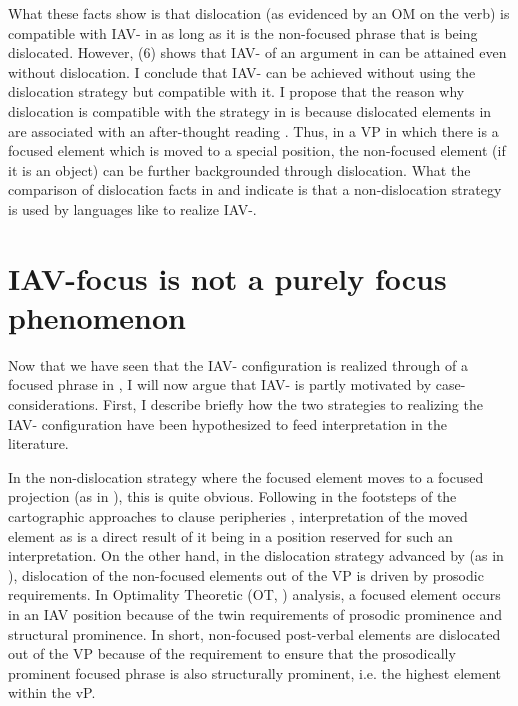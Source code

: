 \documentclass[output=paper,newtxmath,modfonts,nonflat,draft]{langsci/langscibook}
\begin{document}
What these facts show is that dislocation (as evidenced by an OM on the verb) is compatible with IAV- in  as long as it is the non-focused phrase that is being dislocated. However, (6) shows that IAV- of an argument in  can be attained even without dislocation. I conclude that  IAV- can be achieved without using the dislocation strategy but compatible with it. I propose that the reason why dislocation is compatible with the  strategy in  is because dislocated elements in  are associated with an after-thought reading \citep{Diercks2013}. Thus, in a VP in which there is a focused element which is moved to a special position, the non-focused element (if it is an object) can be further backgrounded through dislocation. What the comparison of dislocation facts in  and  indicate is that a non-dislocation strategy is used by languages like  to realize IAV-.

\section{ IAV-focus is not a purely focus phenomenon}

Now that we have seen that the IAV- configuration is realized through  of a focused phrase in , I will now argue that  IAV- is partly motivated by case-considerations. First, I describe briefly how the two strategies to realizing the IAV- configuration have been hypothesized to feed  interpretation in the literature.

In the non-dislocation strategy where the focused element moves to a focused projection (as in ), this is quite obvious. Following in the footsteps of the cartographic approaches to clause peripheries \citep{rizzi1997}, interpretation of the moved element as  is a direct result of it being in a position reserved for such an interpretation. On the other hand, in the dislocation strategy advanced by \citet{chengdowning2012} (as in ), dislocation of the non-focused elements out of the VP is driven by prosodic requirements. In  Optimality Theoretic (OT, \citealt{Prince1993}) analysis, a focused element occurs in an IAV position because of the twin requirements of prosodic prominence and structural prominence. In short, non-focused post-verbal elements are dislocated out of the VP because of the requirement to ensure that the prosodically prominent focused phrase is also structurally prominent, i.e. the highest element within the vP. 
\end{document}
